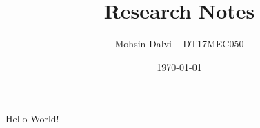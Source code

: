 \documentclass[runningheads, 10pt]{article}
\begin{document}
	
\title{Research Notes}
\author{Mohsin Dalvi -- DT17MEC050}
\date{\today}
\maketitle


	
Hello World! \cite{lentin2019}

%



\end{document}
